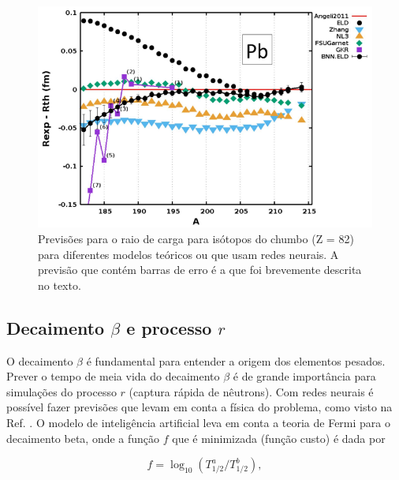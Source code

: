 \documentclass[a4paper,12pt,oneside]{book}
\begin{document}
\begin{figure}[H]
    \centering
    \includegraphics[scale = 0.60]{figs/radii.png}
    \caption{Previsões para o raio de carga para isótopos do chumbo (Z = 82) para diferentes modelos teóricos ou que usam redes neurais. A previsão que contém barras de erro é a que foi brevemente descrita no texto.}
    \label{fig:radii}
\end{figure}


\subsection{Decaimento $\beta$ e processo $r$}

\par O decaimento $\beta$ é fundamental para entender a origem dos elementos pesados. Prever o tempo de meia vida do decaimento $\beta$ é de grande importância para simulações do processo $r$ (captura rápida de nêutrons). Com redes neurais é possível fazer previsões que levam em conta a física do problema, como visto na Ref. \cite{mlbetadecay}. O modelo de inteligência artificial leva em conta a teoria de Fermi para o decaimento beta, onde a função $f$ que é minimizada (função custo) é dada por

\begin{equation}\label{eq:half_life}
    f = \log_{10}(T^{a}_{1/2}/T^{b}_{1/2}),
\end{equation}
\end{document}
